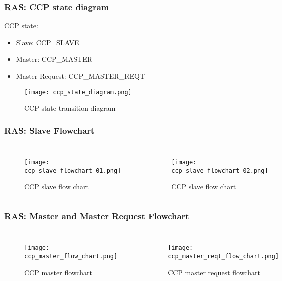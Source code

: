 \documentclass[10pt]{beamer}
\begin{document}
\begin{frame}
    \frametitle{RAS: CCP state diagram}
        CCP state:
        \begin{itemize}
            \item Slave: CCP\_SLAVE
            \item Master:  CCP\_MASTER
            \item Master Request: CCP\_MASTER\_REQT
        \end{itemize}
        \begin{figure}[H]
            \centering
            \texttt{[image: ccp\_state\_diagram.png]}
            \caption{CCP state transition diagram}
            \label{fig:CCP_state_diagram}
        \end{figure}
\end{frame}

\begin{frame}
    \frametitle{RAS: Slave Flowchart}
    \begin{columns}
        \begin{figure}[H]
            \centering
            \texttt{[image: ccp\_slave\_flowchart\_01.png]}
            \caption{CCP slave flow chart}
            \label{fig:ccp_slave_flow_chart}
        \end{figure}
        \begin{figure}[H]
            \centering
            \texttt{[image: ccp\_slave\_flowchart\_02.png]}
            \caption{CCP slave flow chart}
            \label{fig:ccp_slave_flow_chart}
        \end{figure}
    \end{columns}
\end{frame}

\begin{frame}
    \frametitle{RAS: Master and Master Request Flowchart}
    \begin{columns}
        \begin{figure}[H]
            \centering
            \texttt{[image: ccp\_master\_flow\_chart.png]}
            \caption{CCP master flowchart}
        \end{figure}
        \begin{figure}[H]
            \centering
            \texttt{[image: ccp\_master\_reqt\_flow\_chart.png]}
            \caption{CCP master request flowchart}
            \label{fig:ccp_slave_flow_chart}
        \end{figure}
    \end{columns}
\end{frame}
\end{document}
